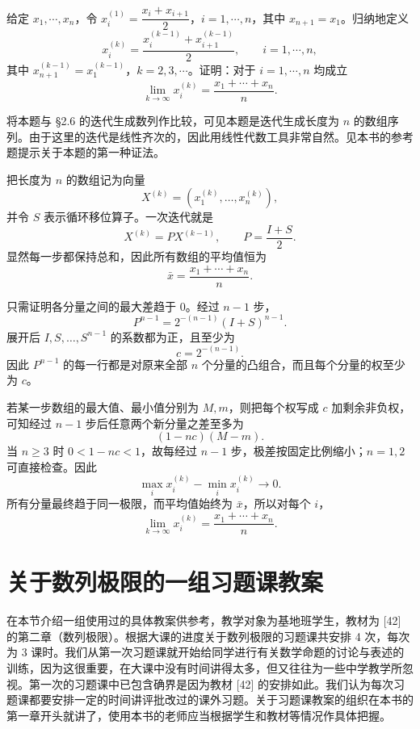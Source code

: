 \begin{xreferenceproblem}[20]
给定 $x_1,\cdots,x_n$，令 $x_i^{(1)}=\dfrac{x_i+x_{i+1}}2$，$i=1,\cdots,n$，其中 $x_{n+1}=x_1$。归纳地定义
  \[
    x_i^{(k)}=\frac{x_i^{(k-1)}+x_{i+1}^{(k-1)}}2,
    \qquad i=1,\cdots,n,
  \]
  其中 $x_{n+1}^{(k-1)}=x_1^{(k-1)}$，$k=2,3,\cdots$。证明：对于 $i=1,\cdots,n$ 均成立
  \[
    \lim_{k\to\infty}x_i^{(k)}=\frac{x_1+\cdots+x_n}{n}.
  \]

  \begin{xremark}
  将本题与 §2.6 的迭代生成数列作比较，可见本题是迭代生成长度为 $n$ 的数组序列。由于这里的迭代是线性齐次的，因此用线性代数工具非常自然。见本书的参考题提示关于本题的第一种证法。
  \end{xremark}
\end{xreferenceproblem}
\begin{xsolution}
把长度为 $n$ 的数组记为向量
\[
  X^{(k)}=(x_1^{(k)},\ldots,x_n^{(k)}),
\]
并令 $S$ 表示循环移位算子。一次迭代就是
\[
  X^{(k)}=PX^{(k-1)},
  \qquad
  P=\frac{I+S}{2}.
\]
显然每一步都保持总和，因此所有数组的平均值恒为
\[
  \bar x=\frac{x_1+\cdots+x_n}{n}.
\]

只需证明各分量之间的最大差趋于 $0$。经过 $n-1$ 步，
\[
  P^{n-1}=2^{-(n-1)}(I+S)^{n-1}.
\]
展开后 $I,S,\ldots,S^{n-1}$ 的系数都为正，且至少为
\[
  c=2^{-(n-1)}.
\]
因此 $P^{n-1}$ 的每一行都是对原来全部 $n$ 个分量的凸组合，而且每个分量的权至少为 $c$。

若某一步数组的最大值、最小值分别为 $M,m$，则把每个权写成 $c$ 加剩余非负权，可知经过 $n-1$ 步后任意两个新分量之差至多为
\[
  (1-nc)(M-m).
\]
当 $n\ge3$ 时 $0<1-nc<1$，故每经过 $n-1$ 步，极差按固定比例缩小；$n=1,2$ 可直接检查。因此
\[
  \max_i x_i^{(k)}-\min_i x_i^{(k)}\to0.
\]
所有分量最终趋于同一极限，而平均值始终为 $\bar x$，所以对每个 $i$，
\[
  \boxed{\lim_{k\to\infty}x_i^{(k)}
  =\frac{x_1+\cdots+x_n}{n}}.
\]
\end{xsolution}


\section{关于数列极限的一组习题课教案}

在本节介绍一组使用过的具体教案供参考，教学对象为基地班学生，教材为 [42] 的第二章（数列极限）。根据大课的进度关于数列极限的习题课共安排 4 次，每次为 3 课时。我们从第一次习题课就开始给同学进行有关数学命题的讨论与表述的训练，因为这很重要，在大课中没有时间讲得太多，但又往往为一些中学教学所忽视。第一次的习题课中已包含确界是因为教材 [42] 的安排如此。我们认为每次习题课都要安排一定的时间讲评批改过的课外习题。关于习题课教案的组织在本书的第一章开头就讲了，使用本书的老师应当根据学生和教材等情况作具体把握。


